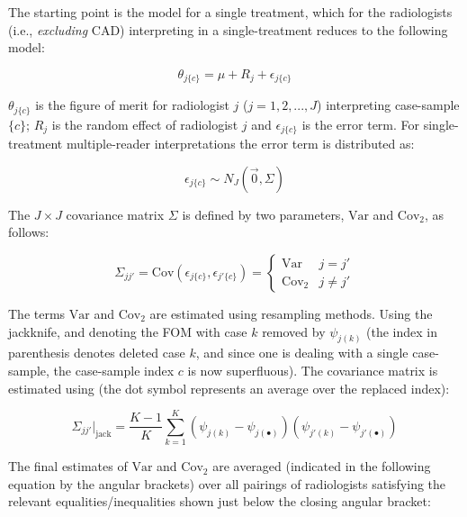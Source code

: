 \documentclass[
]{book}
\begin{document}
The starting point is the \citep{obuchowski1995hypothesis} model for a single treatment, which for the radiologists (i.e., \emph{excluding} CAD) interpreting in a single-treatment reduces to the following model:

\begin{equation}
\theta_{j\{c\}}=\mu+R_j+\epsilon_{j\{c\}}
\label{eq:standalone-or-model-single-treatment}
\end{equation}

\(\theta_{j\{c\}}\) is the figure of merit for radiologist \(j\) (\(j = 1, 2, ..., J\)) interpreting case-sample \(\{c\}\); \(R_j\) is the random effect of radiologist \(j\) and \(\epsilon_{j\{c\}}\) is the error term. For single-treatment multiple-reader interpretations the error term is distributed as:

\begin{equation}
\epsilon_{j\{c\}}\sim N_{J}\left ( \vec{0} , \Sigma \right )
\label{eq:standalone-cad-1t-eps-sampling}
\end{equation}

The \(J \times J\) covariance matrix \(\Sigma\) is defined by two parameters, \(\text{Var}\) and \(\text{Cov}_2\), as follows:

\begin{equation}
\Sigma_{jj'} = \text{Cov}\left ( \epsilon_{j\{c\}}, \epsilon_{j'\{c\}} \right )
=
\left\{\begin{matrix}
\text{Var} & j = j'\\ 
\text{Cov}_2 & j \neq j'
\end{matrix}\right.
\label{eq:standalone-cad-1t-var-cov2-sampling}
\end{equation}

The terms \(\text{Var}\) and \(\text{Cov}_2\) are estimated using resampling methods. Using the jackknife, and denoting the FOM with case \(k\) removed by \(\psi_{j(k)}\) (the index in parenthesis denotes deleted case \(k\), and since one is dealing with a single case-sample, the case-sample index \(c\) is now superfluous). The covariance matrix is estimated using (the dot symbol represents an average over the replaced index):

\begin{equation}
\Sigma_{jj'}|_\text{jack} = \frac{K-1}{K} \sum_{k=1}^{K} \left ( \psi_{j(k)}  - \psi_{j(\bullet)} \right ) \left ( \psi_{j'(k)}  - \psi_{j'(\bullet)} \right )
\label{eq:standalone-cad-1t-sigma-jackknife}
\end{equation}

The final estimates of \(\text{Var}\) and \(\text{Cov}_2\) are averaged (indicated in the following equation by the angular brackets) over all pairings of radiologists satisfying the relevant equalities/inequalities shown just below the closing angular bracket:
\end{document}
